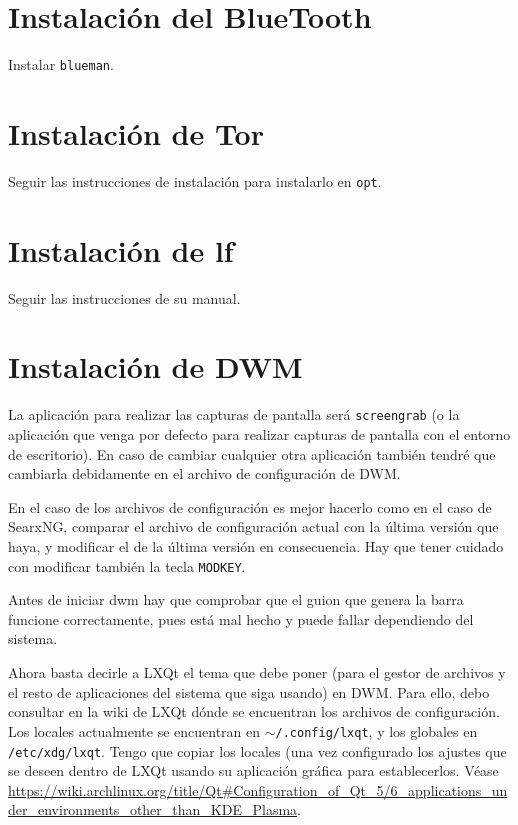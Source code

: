 \documentclass{article}
\begin{document}
    \section{Instalación del BlueTooth}
    Instalar \texttt{blueman}.

    \section{Instalación de Tor}
    Seguir las instrucciones de instalación para instalarlo en \texttt{opt}.

    \section{Instalación de lf}
    Seguir las instrucciones de su manual.

    \section{Instalación de DWM}
    La aplicación para realizar las capturas de pantalla será
    \texttt{screengrab} (o la aplicación que venga por defecto para realizar
    capturas de pantalla con el entorno de escritorio). En caso de cambiar
    cualquier otra aplicación también tendré que cambiarla debidamente en el
    archivo de configuración de DWM.

    En el caso de los archivos de configuración es mejor hacerlo como en el caso
    de SearxNG, comparar el archivo de configuración actual con la última
    versión que haya, y modificar el de la última versión en consecuencia. Hay
    que tener cuidado con modificar también la tecla \texttt{MODKEY}.

    Antes de iniciar dwm hay que comprobar que el guion que genera la barra
    funcione correctamente, pues está mal hecho y puede fallar dependiendo del
    sistema.

    Ahora basta decirle a LXQt el tema que debe poner (para el gestor de
    archivos y el resto de aplicaciones del sistema que siga usando) en DWM.
    Para ello, debo consultar en la wiki de LXQt dónde se encuentran los
    archivos de configuración. Los locales actualmente se encuentran en
    \texttt{$\sim$/.config/lxqt}, y los globales en \texttt{/etc/xdg/lxqt}.
    Tengo que copiar los locales (una vez configurado los ajustes que se deseen
    dentro de LXQt usando su aplicación gráfica para establecerlos. Véase
    \href{https://wiki.archlinux.org/title/Qt#Configuration_of_Qt_5/6_applications_under_environments_other_than_KDE_Plasma}
    {https://wiki.archlinux.org/title/Qt\#Configuration\_of\_Qt\_5/6\_applications\_under\_\-environments\_\-other\_than\_KDE\_Plasma}.
\end{document}
